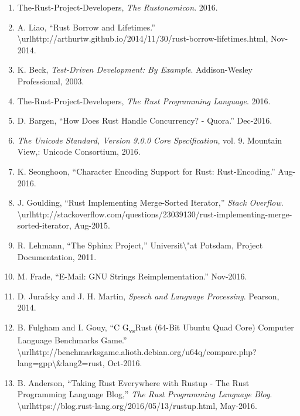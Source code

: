\begin{enumerate}
  M. I. T. R. E. Corporation, ``CWE - Common Weakness Enumeration, a
  Community-Developed Dictionary of Software Weakness Types.''
  \textbackslash{}urlhttps://cwe.mitre.org/, 2016.
\item
  The-Rust-Project-Developers, \emph{The Rustonomicon}. 2016.
\item
  A. Liao, ``Rust Borrow and Lifetimes.''
  \textbackslash{}urlhttp://arthurtw.github.io/2014/11/30/rust-borrow-lifetimes.html,
  Nov-2014.
\item
  K. Beck, \emph{Test-Driven Development: By Example}. Addison-Wesley
  Professional, 2003.
\item
  The-Rust-Project-Developers, \emph{The Rust Programming Language}.
  2016.
\item
  D. Bargen, ``How Does Rust Handle Concurrency? - Quora.'' Dec-2016.
\item
  \emph{The Unicode Standard, Version 9.0.0 Core Specification}, vol. 9.
  Mountain View,: Unicode Consortium, 2016.
\item
  K. Seonghoon, ``Character Encoding Support for Rust: Rust-Encoding.''
  Aug-2016.
\item
  J. Goulding, ``Rust Implementing Merge-Sorted Iterator,'' \emph{Stack
  Overflow}.
  \textbackslash{}urlhttp://stackoverflow.com/questions/23039130/rust-implementing-merge-sorted-iterator,
  Aug-2015.
\item
  R. Lehmann, ``The Sphinx Project,'' Universit\textbackslash{}"at
  Potsdam, Project Documentation, 2011.
\item
  M. Frade, ``E-Mail: GNU Strings Reimplementation.'' Nov-2016.
\item
  D. Jurafsky and J. H. Martin, \emph{Speech and Language Processing}.
  Pearson, 2014.
\item
  B. Fulgham and I. Gouy, ``C G\textsubscript{vs}Rust (64-Bit Ubuntu
  Quad Core) \textbar{} Computer Language Benchmarks Game.''
  \textbackslash{}urlhttp://benchmarksgame.alioth.debian.org/u64q/compare.php?lang=gpp\textbackslash{}\&lang2=rust,
  Oct-2016.
\item
  B. Anderson, ``Taking Rust Everywhere with Rustup - The Rust
  Programming Language Blog,'' \emph{The Rust Programming Language
  Blog}.
  \textbackslash{}urlhttps://blog.rust-lang.org/2016/05/13/rustup.html,
  May-2016.
\end{enumerate}
